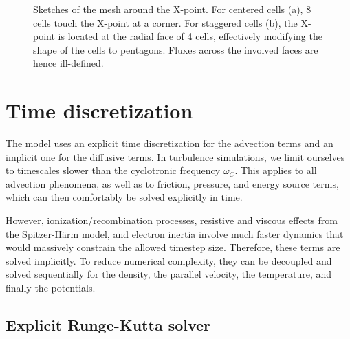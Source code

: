 \begin{figure}[H]
\begin{subfigure}[t]{0.39\textwidth}
		\label{fig:StaggeredXpoint}
	\end{subfigure}
	\caption{ Sketches of the mesh around the X-point. For centered cells (a), 8 cells touch the X-point at a corner. For staggered cells (b), the X-point is located at the radial face of 4 cells, effectively modifying the shape of the cells to pentagons. Fluxes across the involved faces are hence ill-defined. }
	\label{fig:XpointDiscretization}
\end{figure}



\section{Time discretization}

The model uses an explicit time discretization for the advection terms and an implicit one for the diffusive terms. In turbulence simulations, we limit ourselves to timescales slower than the cyclotronic frequency $\omega_C$. This applies to all advection phenomena, as well as to friction, pressure, and energy source terms, which can then comfortably be solved explicitly in time. \newline

However, ionization/recombination processes, resistive and viscous effects from the Spitzer-Härm model, and electron inertia involve much faster dynamics that would massively constrain the allowed timestep size. Therefore, these terms are solved implicitly. To reduce numerical complexity, they can be decoupled and solved sequentially for the density, the parallel velocity, the temperature, and finally the potentials. 

\subsection{Explicit Runge-Kutta solver}



